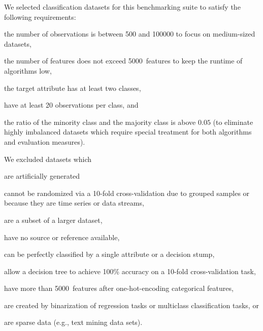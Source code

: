 \documentclass[twoside,11pt]{article}
\begin{document}
We selected classification datasets for this benchmarking suite to satisfy the following requirements:
\begin{enumerate*}[(a)]
  \item the number of observations is between \num{500} and \num{100000} to focus on medium-sized datasets,
  \item the number of features does not exceed \num{5000}~features to keep the runtime of algorithms low,
  \item the target attribute has at least two classes,
  \item have at least 20 observations per class, and\
  \item the ratio of the minority class and the majority class is above $0.05$ (to eliminate highly imbalanced datasets which require special treatment for both algorithms and evaluation measures).
\end{enumerate*}
We excluded datasets which
\begin{enumerate*}[(a)]
  \item are artificially generated %
  \item cannot be randomized via a 10-fold cross-validation due to grouped samples or because they are time series or data streams,
  \item are a subset of a larger dataset, %
  \item have no source or reference available,
  \item can be perfectly classified by a single attribute or a decision stump,
  \item allow a decision tree to achieve 100\% accuracy on a 10-fold cross-validation task,
  \item have more than \num{5000}~features after one-hot-encoding categorical features,
  \item are created by binarization of regression tasks or multiclass classification tasks, or
  \item are sparse data (e.g., text mining data sets).
\end{enumerate*}
\end{document}
